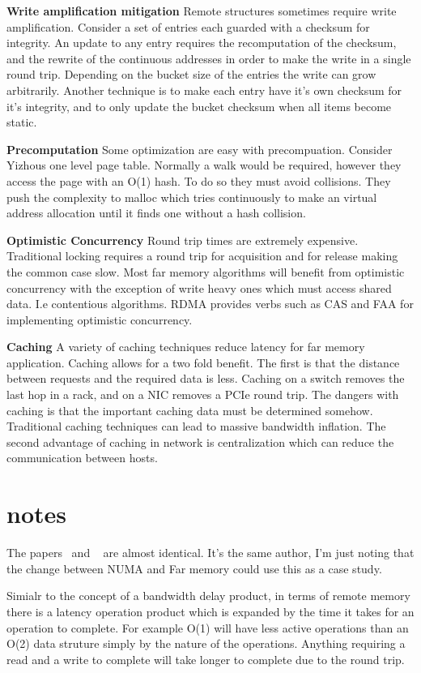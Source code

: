 \textbf{Write amplification mitigation} Remote structures sometimes require write
amplification. Consider a set of entries each guarded with a checksum for
integrity. An update to any entry requires the recomputation of the checksum,
and the rewrite of the continuous addresses in order to make the write in a
single round trip. Depending on the bucket size of the entries the write can
grow arbitrarily. Another technique is to make each entry have it's own checksum
for it's integrity, and to only update the bucket checksum when all items become
static.

\textbf{Precomputation} Some optimization are easy with precompuation. Consider
Yizhous one level page table. Normally a walk would be required, however they
access the page with an O(1) hash. To do so they must avoid collisions. They
push the complexity to malloc which tries continuously to make an virtual address
allocation until it finds one without a hash collision.

\textbf{Optimistic Concurrency} Round trip times are extremely expensive.
Traditional locking requires a round trip for acquisition and for release making
the common case slow. Most far memory algorithms will benefit from optimistic
concurrency with the exception of write heavy ones which must access shared
data. I.e contentious algorithms. RDMA provides verbs such as CAS and FAA for
implementing optimistic concurrency.

\textbf{Caching} A variety of caching techniques reduce latency for far memory
application. Caching allows for a two fold benefit. The first is that the
distance between requests and the required data is less. Caching on a switch
removes the last hop in a rack, and on a NIC removes a PCIe round trip. The
dangers with caching is that the important caching data must be determined
somehow. Traditional caching techniques can lead to massive bandwidth inflation.
The second advantage of caching in network is centralization which can reduce
the communication between hosts.


\section{notes}

The papers~\cite{one-side-hash} and ~\cite{write-optimized-hash} are almost
identical. It's the same author, I'm just noting that the change between NUMA
and Far memory could use this as a case study.


Simialr to the concept of a bandwidth delay product, in terms of remote memory
there is a latency operation product which is expanded by the time it takes for
an operation to complete. For example O(1) will have less active operations than
an O(2) data struture simply by the nature of the operations. Anything requiring
a read and a write to complete will take longer to complete due to the round
trip.

